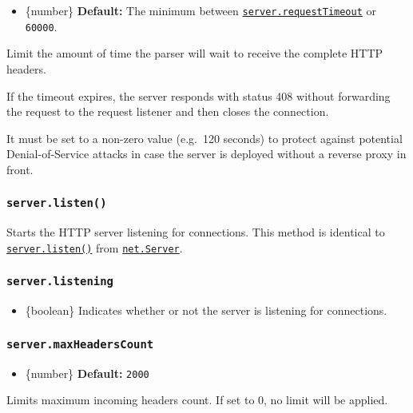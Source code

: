 \begin{itemize}
\tightlist
\item
  \{number\} \textbf{Default:} The minimum between
  \hyperref[serverrequesttimeout]{\texttt{server.requestTimeout}} or
  \texttt{60000}.
\end{itemize}

Limit the amount of time the parser will wait to receive the complete
HTTP headers.

If the timeout expires, the server responds with status 408 without
forwarding the request to the request listener and then closes the
connection.

It must be set to a non-zero value (e.g.~120 seconds) to protect against
potential Denial-of-Service attacks in case the server is deployed
without a reverse proxy in front.

\subsubsection{\texorpdfstring{\texttt{server.listen()}}{server.listen()}}\label{server.listen}

Starts the HTTP server listening for connections. This method is
identical to \href{net.md\#serverlisten}{\texttt{server.listen()}} from
\href{net.md\#class-netserver}{\texttt{net.Server}}.

\subsubsection{\texorpdfstring{\texttt{server.listening}}{server.listening}}\label{server.listening}

\begin{itemize}
\tightlist
\item
  \{boolean\} Indicates whether or not the server is listening for
  connections.
\end{itemize}

\subsubsection{\texorpdfstring{\texttt{server.maxHeadersCount}}{server.maxHeadersCount}}\label{server.maxheaderscount}

\begin{itemize}
\tightlist
\item
  \{number\} \textbf{Default:} \texttt{2000}
\end{itemize}

Limits maximum incoming headers count. If set to 0, no limit will be
applied.

